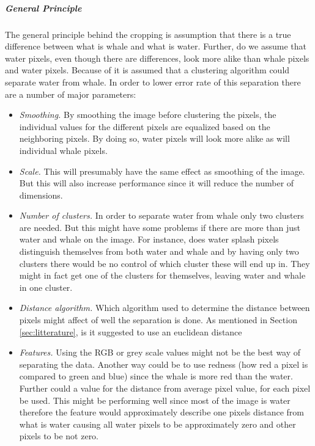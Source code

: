 \subparagraph{General Principle}
The general principle behind the cropping is  assumption that there is a true difference between what is whale and what is water. Further, do we assume that water pixels, even though there are differences, look more alike than whale pixels and water pixels.
Because of it is assumed that a clustering algorithm could separate water from whale.
In order to lower error rate of this separation there are a number of major parameters:
\begin{itemize}
\item \textit{Smoothing.} By smoothing the image before clustering the pixels, the individual values for the different pixels are equalized based on the neighboring pixels. By doing so, water pixels will look more alike as will individual whale pixels.
\item \textit{Scale.} This will presumably have the same effect as smoothing of the image. But this will also increase performance since it will reduce the number of dimensions.  
\item \textit{Number of clusters.} In order to separate water from whale only two clusters are needed. But this might have some problems if there are more than just water and whale on the image. For instance, does water splash pixels distinguish themselves from both water and whale and by having  only two clusters there would be no control of which cluster these will end up in. They might in fact get one of the clusters for themselves, leaving water and whale in one cluster.
\item \textit{Distance algorithm.} Which algorithm used to determine the distance between pixels might affect of well the separation is done. As mentioned in Section \ref{sec:litterature}, is it suggested to use an euclidean distance
\item \textit{Features.} Using the RGB or grey scale values might not be the best way of separating the data. Another way could be to use redness (how red a pixel is compared to green and blue) since the whale is more red than the water. Further could a value for the distance from average pixel value, for each pixel be used. This might be performing well since most of the image is water therefore the feature would approximately describe one pixels distance from what is water causing all water pixels to be approximately zero and other pixels to be not zero.
\end{itemize}
